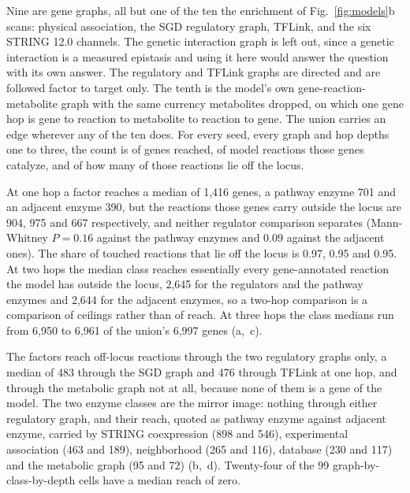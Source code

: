  Nine are gene graphs, all but one of the ten the
enrichment of Fig.~\ref{fig:models}b scans: physical association, the SGD regulatory
graph, TFLink, and the six STRING 12.0 channels. The genetic interaction graph is left
out, since a genetic interaction is a measured epistasis and using it here would answer
the question with its own answer. The regulatory and TFLink graphs are directed and are
followed factor to target only. The tenth is the model's own gene-reaction-metabolite
graph with the same currency metabolites dropped, on which one gene hop is gene to
reaction to metabolite to reaction to gene. The union carries an edge wherever any of the
ten does. For every seed, every graph and hop depths one to three, the count is of genes
reached, of model reactions those genes catalyze, and of how many of those reactions lie
off the locus.

 At one
hop a factor reaches a median of 1,416 genes, a pathway enzyme 701 and an adjacent enzyme
390, but the reactions those genes carry outside the locus are 904, 975 and 667
respectively, and neither regulator comparison separates (Mann-Whitney $P = 0.16$ against
the pathway enzymes and $0.09$ against the adjacent ones). The share of touched reactions
that lie off the locus is 0.97, 0.95 and 0.95. At two hops the median class reaches essentially every
gene-annotated reaction the model has outside the locus, 2,645 for the regulators and the
pathway enzymes and 2,644 for the adjacent enzymes, so a two-hop comparison is a
comparison of ceilings rather than of reach. At three hops the class medians run from
6,950 to 6,961 of the union's 6,997 genes (a,~c).

 The factors reach off-locus
reactions through the two regulatory graphs only, a median of 483 through the SGD graph and
476 through TFLink at one hop, and through the metabolic graph not at all, because none of
them is a gene of the model. The two enzyme classes are the mirror image: nothing through
either regulatory graph, and their reach, quoted as pathway enzyme against adjacent enzyme,
carried by STRING coexpression (898 and 546), experimental association (463 and 189),
neighborhood (265 and 116), database (230 and 117) and the metabolic graph (95 and 72)
(b,~d). Twenty-four of the 99 graph-by-class-by-depth cells have a
median reach of zero.

